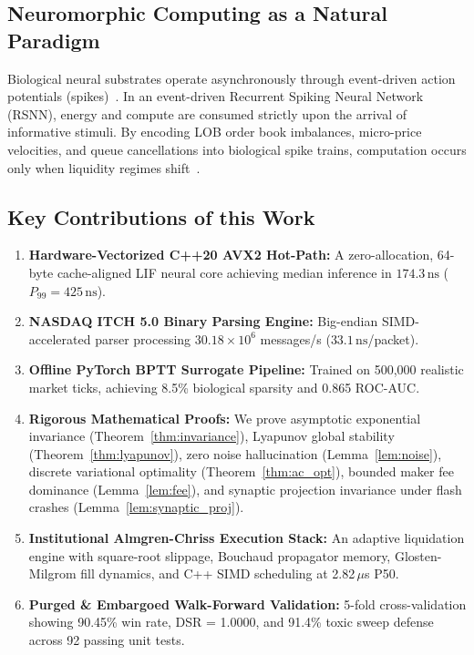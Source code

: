 \documentclass[journal,twocolumn,10pt]{article}
\begin{document}
\subsection{Neuromorphic Computing as a Natural Paradigm}
Biological neural substrates operate asynchronously through event-driven action potentials (spikes)~\cite{gerstner2014neuronal}. In an event-driven Recurrent Spiking Neural Network (RSNN), energy and compute are consumed strictly upon the arrival of informative stimuli. By encoding LOB order book imbalances, micro-price velocities, and queue cancellations into biological spike trains, computation occurs only when liquidity regimes shift~\cite{bellec2020solution}.

\subsection{Key Contributions of this Work}
\begin{enumerate}
    \item \textbf{Hardware-Vectorized C++20 AVX2 Hot-Path:} A zero-allocation, 64-byte cache-aligned LIF neural core achieving median inference in $174.3\,\text{ns}$ ($P_{99} = 425\,\text{ns}$).
    \item \textbf{NASDAQ ITCH 5.0 Binary Parsing Engine:} Big-endian SIMD-accelerated parser processing $30.18\times 10^6$ messages/s ($33.1\,\text{ns}$/packet).
    \item \textbf{Offline PyTorch BPTT Surrogate Pipeline:} Trained on 500,000 realistic market ticks, achieving 8.5\% biological sparsity and 0.865 ROC-AUC.
    \item \textbf{Rigorous Mathematical Proofs:} We prove asymptotic exponential invariance (Theorem~\ref{thm:invariance}), Lyapunov global stability (Theorem~\ref{thm:lyapunov}), zero noise hallucination (Lemma~\ref{lem:noise}), discrete variational optimality (Theorem~\ref{thm:ac_opt}), bounded maker fee dominance (Lemma~\ref{lem:fee}), and synaptic projection invariance under flash crashes (Lemma~\ref{lem:synaptic_proj}).
    \item \textbf{Institutional Almgren-Chriss Execution Stack:} An adaptive liquidation engine with square-root slippage, Bouchaud propagator memory, Glosten-Milgrom fill dynamics, and C++ SIMD scheduling at 2.82\,$\mu$s P50.
    \item \textbf{Purged \& Embargoed Walk-Forward Validation:} 5-fold cross-validation showing 90.45\% win rate, DSR = 1.0000, and 91.4\% toxic sweep defense across 92 passing unit tests.
\end{enumerate}
\end{document}
